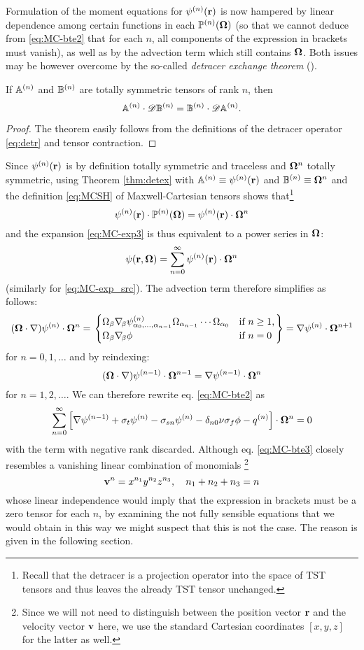 Formulation of the moment equations for $\fmom(\br)$ is now hampered by linear dependence among certain functions in
each $\PP(\bomega)$ (so that we cannot deduce from \eqref{eq:MC-bte2} that for each $n$, all components of the
expression in brackets must vanish), as well as by the advection term which still contains $\bomega$. Both issues may be
however overcome by the so-called \textit{detracer exchange theorem} (\cite[Sec. 5.2]{Applequist2}).
\begin{theorem}\label{thm:detex}
  If $\AA$ and $\BB$ are totally symmetric tensors of rank $n$, then
  $$
    \AA\contr\detr \BB = \BB\contr\detr \AA.
  $$
\end{theorem}
\begin{proof}
  The theorem easily follows from the definitions of the detracer operator \eqref{eq:detr} and tensor contraction.
\end{proof}
Since $\fmom(\br)$ is by definition totally symmetric and traceless and $\bomega^{n}$ totally symmetric, using Theorem 
\ref{thm:detex} with $\AA \equiv \fmom(\br)$ and $\BB \equiv \bomega^{n}$ and the definition \eqref{eq:MCSH} of 
Maxwell-Cartesian tensors shows that\footnote{Recall that the detracer is a projection operator into the space of 
TST tensors and thus leaves the already TST tensor unchanged.} 
$$
  \fmom(\br)\contr\PP(\bomega) = \fmom(\br)\contr\bomega^n
$$
and the expansion \eqref{eq:MC-exp3} is thus equivalent to a power series in $\bomega$:
$$
  \psi(\br,\bomega) = \suma[n]{0}{\infty}\fmom(\br)\contr\bomega^n
$$
(similarly for \eqref{eq:MC-exp_src}). The advection term therefore simplifies as follows:
$$
  (\bomega\cdot\nabla)\fmom\contr\bomega^n = \left.
  \pw{\Omega_\beta\gradcomp\beta\fmom_{\alpha_0,\ldots,\alpha_{n-1}}\Omega_{\alpha_{n-1}}\cdots\Omega_{\alpha_0}}{if $n \geq 1$}
     {\Omega_\beta\gradcomp\beta\phi}{if $n = 0$}\right\}
   = \nabla\fmom\contr[n+1]\bomega^{n+1}
$$
for $n = 0,1,\ldots$ and by reindexing:
$$
  (\bomega\cdot\nabla)\fmom[n-1]\contr\bomega^{n-1} = \nabla\fmom[n-1]\contr[n]\bomega^{n}
$$
for $n = 1,2,\ldots$. We can therefore rewrite eq. \eqref{eq:MC-bte2} as
\begin{equation}\label{eq:MC-bte3}
  \suma[n]{0}{\infty}\left[\nabla\fmom[n-1] + \sigma_t\fmom
  - \sigma_{sn}\fmom - \kron{n}{0}\nu\sigma_f\phi - \qmom\right]\contr\bomega^n = 0
\end{equation}
with the term with negative rank discarded. Although eq. \eqref{eq:MC-bte3} closely resembles a vanishing linear 
combination of monomials
\footnote{Since we will not need to distinguish between the position vector $\br$ and the velocity vector $\bv$ here, 
we use the standard Cartesian coordinates $[x,y,z]$ for the latter as well.}
$$
  \bv^n = x^{n_1}y^{n_2}z^{n_3},\quad n_1 + n_2 + n_3 = n
$$
whose linear independence would imply that the expression in brackets must be a zero tensor for each $n$, by examining 
the not fully sensible equations that we would obtain in this way we might suspect that this is not the case. 
The reason is given in the following section.


